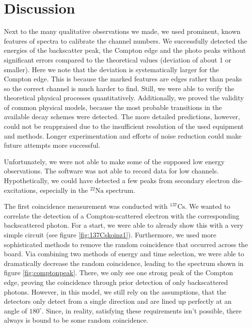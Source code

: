 \section*{Discussion}
%
\par
%
Next to the many qualitative observations we made, we used prominent, known features of spectra to calibrate the channel numbers.
We successfully detected the energies of the backscatter peak, the Compton edge and the photo peaks without significant errors compared to the theoretical values (deviation of about \SI{1}{\sigma} or smaller).
Here we note that the deviation is systematically larger for the Compton edge.
This is because the marked features are edges rather than peaks so the correct channel is much harder to find.
Still, we were able to verify the theoretical physical processes quantitatively.
Additionally, we proved the validity of common physical models, because the most probable transitions in the available decay schemes were detected.
The more detailed predictions, however, could not be reappraised due to the insufficient resolution of the used equipment and methods.
Longer experimentation and efforts of noise reduction could make future attempts more successful.
%
\par
%
Unfortunately, we were not able to make some of the supposed low energy observations.
The software was not able to record data for low channels.
Hypothetically, we could have detected a few peaks from secondary electron dis-excitations, especially in the $^{22}\text{Na}$ spectrum.
%
\par
%
The first coincidence measurement was conducted with $^{137}\text{Cs}$.
We wanted to correlate the detection of a Compton-scattered electron with the corresponding backscattered photon.
For a start, we were able to already show this with a very simple circuit (see figure \ref{fig:137Cskoinz1}).
Furthermore, we used more sophisticated methods to remove the random coincidence that occurred across the board.
Via combining two methods of energy and time selection, we were able to dramatically decrease the random coincidence, leading to the spectrum shown in figure \ref{fig:comptonpeak}.
There, we only see one strong peak of the Compton edge, proving the coincidence through prior detection of only backscattered photons.
However, in this model, we still rely on the assumptions, that the detectors only detect from a single direction and are lined up perfectly at an angle of $180^{\circ}$.
Since, in reality, satisfying these requirements isn't possible, there always is bound to be some random coincidence.
